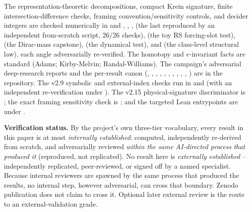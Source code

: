 \documentclass[11pt]{article}
\theoremstyle{remark}
\begin{document}
The representation-theoretic decompositions, compact Krein signature, finite intersection-difference checks, framing convention/sensitivity controls, and decider integers are checked numerically in  and , , ,  (the last reproduced by an independent from-scratch script, 26/26 checks),  (the toy RS forcing-slot test),  (the Dirac-mass capstone),  (the dynamical test), and  (the class-level structural law), each angle adversarially re-verified. The homotopy and $e$-invariant facts are standard (Adams; Kirby-Melvin; Randal-Williams). The campaign's adversarial deep-research reports and the per-result canon (, , , , , , , , , , ) are in the repository. The v2.9 symbolic and external-index checks run in  and  (with an independent re-verification under ). The v2.15 physical-signature discriminator is ; the exact framing sensitivity check is ; and the targeted Lean entrypoints are under .

\textbf{Verification status.} By the project's own three-tier vocabulary, every result in this paper is at most \emph{internally established}: computed, independently re-derived from scratch, and adversarially reviewed \emph{within the same AI-directed process that produced it} (reproduced, not replicated). No result here is \emph{externally established} -- independently replicated, peer-reviewed, or signed off by a named specialist. Because internal reviewers are spawned by the same process that produced the results, no internal step, however adversarial, can cross that boundary. Zenodo publication does not claim to cross it. Optional later external review is the route to an external-validation grade.
\end{document}
